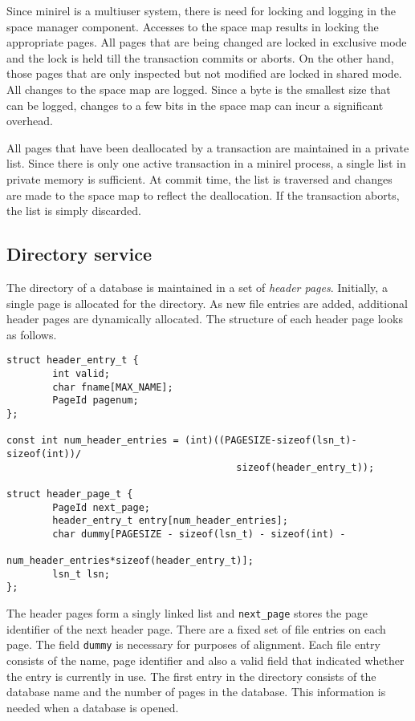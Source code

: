 Since minirel is  a multiuser system,  there  is need  for locking and
logging in the space manager   component. Accesses  to the space   map
results in locking  the appropriate pages.  All  pages that are  being
changed are  locked in exclusive mode and   the lock is held  till the
transaction commits or aborts. On the other hand, those pages that are
only inspected but not modified are locked in shared mode. All changes
to  the space map are logged.  Since a byte is  the smallest size that
can  be logged, changes  to a few bits  in  the space map  can incur a
significant overhead.

All pages  that have been deallocated  by a transaction are maintained
in a private list.  Since there is only   one active transaction in  a
minirel process, a  single  list in private  memory  is sufficient. At
commit time, the list  is traversed and changes  are made to the space
map to reflect the deallocation.  If the transaction aborts, the  list
is simply discarded.

\subsection{Directory service}

The directory  of a database   is maintained in a   set of {\em header
pages}. Initially,  a single page  is allocated  for the directory. As
new file  entries are added,  additional header  pages are dynamically
allocated. The structure of each header page looks as follows.

\begin{verbatim}
struct header_entry_t {
        int valid;
        char fname[MAX_NAME];
        PageId pagenum;
};

const int num_header_entries = (int)((PAGESIZE-sizeof(lsn_t)-sizeof(int))/
                                        sizeof(header_entry_t));
 
struct header_page_t {
        PageId next_page;
        header_entry_t entry[num_header_entries];
        char dummy[PAGESIZE - sizeof(lsn_t) - sizeof(int) - 
                             num_header_entries*sizeof(header_entry_t)];
        lsn_t lsn;
};
\end{verbatim}

The header pages form a singly linked  list and {\tt next\_page} stores
the page identifier of the next header page. There are  a fixed set of
file  entries on each  page. The  field {\tt  dummy} is  necessary for
purposes of  alignment.  Each  file entry consists  of  the name, page
identifier and also a valid field that  indicated whether the entry is
currently  in use. The  first entry in the   directory consists of the
database  name   and  the number  of   pages  in the  database.   This
information is needed when a database is opened.

